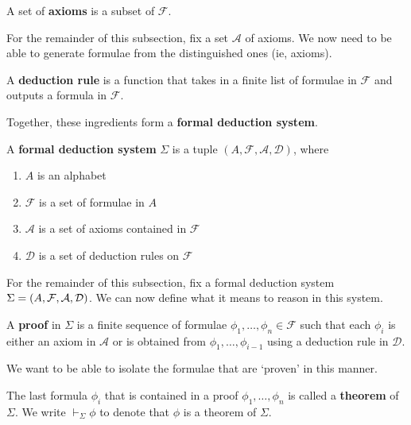 \begin{boxdefinition}[Axioms]
    A set of \textbf{axioms} is a subset of $\mathcal{F}$.
\end{boxdefinition}

For the remainder of this subsection, fix a set $\mathcal{A}$ of axioms. We now need to be able to generate formulae from the distinguished ones (ie, axioms).

\begin{boxdefinition}
    A \textbf{deduction rule} is a function that takes in a finite list of formulae in $\mathcal{F}$ and outputs a formula in $\mathcal{F}$.
\end{boxdefinition}

Together, these ingredients form a \textbf{formal deduction system}.

\begin{boxdefinition}\label{Ch1:Def:Formal_Deduction_System}
    A \textbf{formal deduction system} $\Sigma$ is a tuple $(A, \mathcal{F}, \mathcal{A}, \mathcal{D})$, where
    \begin{enumerate}
        \item $A$ is an alphabet
        \item $\mathcal{F}$ is a set of formulae in $A$
        \item $\mathcal{A}$ is a set of axioms contained in $\mathcal{F}$
        \item $\mathcal{D}$ is a set of deduction rules on $\mathcal{F}$
    \end{enumerate}
\end{boxdefinition}

For the remainder of this subsection, fix a formal deduction system $\Sigma = \left( A, \mathcal{F}, \mathcal{A}, \mathcal{D} \right)$. We can now define what it means to reason in this system.

\begin{boxdefinition}[Proof]
    A \textbf{proof} in $\Sigma$ is a finite sequence of formulae $\phi_1, \ldots, \phi_n \in \mathcal{F}$ such that each $\phi_i$ is either an axiom in $\mathcal{A}$ or is obtained from $\phi_1, \ldots, \phi_{i-1}$ using a deduction rule in $\mathcal{D}$.
\end{boxdefinition}

We want to be able to isolate the formulae that are `proven' in this manner.

\begin{boxdefinition}[Theorem]\label{Ch1:Def:Thm}
    The last formula $\phi_i$ that is contained in a proof $\phi_1, \ldots, \phi_n$ is called a \textbf{theorem} of $\Sigma$. We write $\vdash_{\Sigma} \phi$ to denote that $\phi$ is a theorem of $\Sigma$.
\end{boxdefinition}

